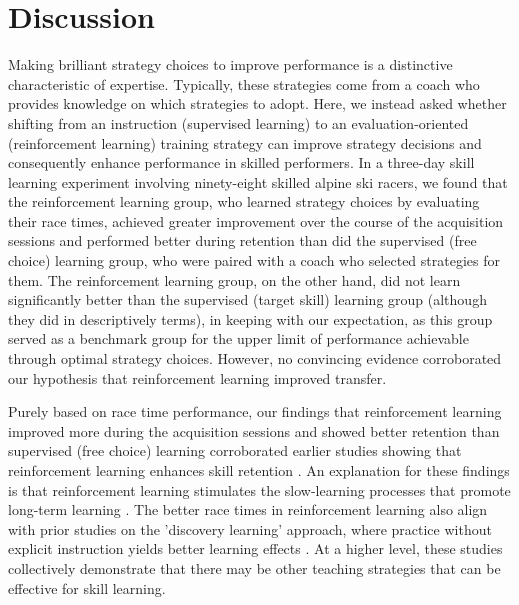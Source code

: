 \documentclass[pdflatex,sn-mathphys-num]{sn-jnl}%
\theoremstyle{thmstyleone}%
\theoremstyle{thmstyletwo}%
\theoremstyle{thmstylethree}%
\begin{document}
\section{Discussion}
Making brilliant strategy choices to improve performance is a distinctive characteristic of expertise. Typically, these strategies come from a coach who provides knowledge on which strategies to adopt. Here, we instead asked whether shifting from an instruction (supervised learning) to an evaluation-oriented (reinforcement learning) training strategy can improve strategy decisions and consequently enhance performance in skilled performers. In a three-day skill learning experiment involving ninety-eight skilled alpine ski racers, we found that the reinforcement learning group, who learned strategy choices by evaluating their race times, achieved greater improvement over the course of the acquisition sessions and performed better during retention than did the supervised (free choice) learning group, who were paired with a coach who selected strategies for them. The reinforcement learning group, on the other hand, did not learn significantly better than the supervised (target skill) learning group (although they did in descriptively terms), in keeping with our expectation, as this group served as a benchmark group for the upper limit of performance achievable through optimal strategy choices. However, no convincing evidence corroborated our hypothesis that reinforcement learning improved transfer.

Purely based on race time performance, our findings that reinforcement learning improved more during the acquisition sessions and showed better retention than supervised (free choice) learning corroborated earlier studies showing that reinforcement learning enhances skill retention \cite{therrien_effective_2016, truong_error-based_2023, hasson_reinforcement_2015, lior_shmuelof_overcoming_2012}. An explanation for these findings is that reinforcement learning stimulates the slow-learning processes that promote long-term learning \cite{huang_rethinking_2011, uehara_learning_2018}. The better race times in reinforcement learning also align with prior studies on the 'discovery learning' approach, where practice without explicit instruction yields better learning effects \cite{wulf_instructions_1997, hodges_learning_2001, hodges_role_1999}. At a higher level, these studies collectively demonstrate that there may be other teaching strategies that can be effective for skill learning. 
\end{document}
